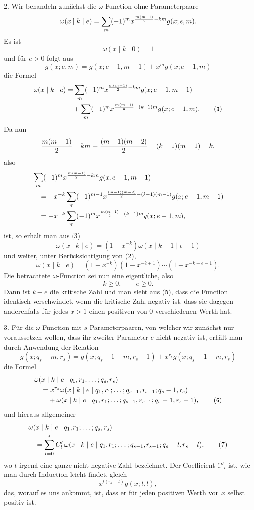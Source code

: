\documentclass[11pt,a4paper]{article}
\begin{document}
2. Wir behandeln zunächst die $\omega$-Function ohne Parameterpaare
\[
 \omega(x\mid k\mid e)=\sum_m(-1)^m x^{{m(m-1)\over2}-km}g(x;e,m).
\]
Es ist
\begin{equation}
 \omega(x\mid k\mid0)=1
\tag{2}
\end{equation}
und für $e>0$ folgt aus
\[
 g(x;e,m)=g(x;e-1,m-1)+x^m g(x;e-1,m)
\]
die Formel
\begin{align}
\omega(x\mid k\mid e)
&=\sum_m(-1)^m x^{{m(m-1)\over2}-km}g(x;e-1,m-1)\notag\\
&\quad+\sum_m(-1)^m x^{{m(m-1)\over2}-(k-1)m}g(x;e-1,m).
\tag{3}
\end{align}
Da nun
\[
 {m(m-1)\over2}-km={(m-1)(m-2)\over2}-(k-1)(m-1)-k,
\]
also
\begin{align*}
&\sum_m(-1)^m x^{{m(m-1)\over2}-km}g(x;e-1,m-1)\\
&\quad=-x^{-k}\sum_m(-1)^{m-1}x^{{(m-1)(m-2)\over2}-(k-1)(m-1)}g(x;e-1,m-1)\\
&\quad=-x^{-k}\sum_m(-1)^m x^{{m(m-1)\over2}-(k-1)m}g(x;e-1,m),
\end{align*}
ist, so erhält man aus (3)
\begin{equation}
 \omega(x\mid k\mid e)=(1-x^{-k})\omega(x\mid k-1\mid e-1)
\tag{4}
\end{equation}
und weiter, unter Berücksichtigung von (2),
\begin{equation}
 \omega(x\mid k\mid e)=(1-x^{-k})(1-x^{-k+1})\cdots(1-x^{-k+e-1}).
\tag{5}
\end{equation}
Die betrachtete $\omega$-Function sei nun eine eigentliche, also
\[
 k\ge0,
 \qquad e\ge0.
\]
Dann ist $k-e$ die kritische Zahl und man sieht aus (5), dass die Function identisch verschwindet, wenn die kritische Zahl negativ ist, dass sie dagegen anderenfalls für jedes $x>1$ einen positiven von 0 verschiedenen Werth hat.

3. Für die $\omega$-Function mit $s$ Parameterpaaren, von welcher wir zunächst nur voraussetzen wollen, dass ihr zweiter Parameter $e$ nicht negativ ist, erhält man durch Anwendung der Relation
\[
 g(x;q_s-m,r_s)=g(x;q_s-1-m,r_s-1)+x^{r_s}g(x;q_s-1-m,r_s)
\]
die Formel
\begin{align}
&\omega(x\mid k\mid e\mid q_1,r_1;\ldots;q_s,r_s)\notag\\
&\quad=x^{r_s}\omega(x\mid k\mid e\mid q_1,r_1;\ldots;q_{s-1},r_{s-1};q_s-1,r_s)\notag\\
&\qquad+\omega(x\mid k\mid e\mid q_1,r_1;\ldots;q_{s-1},r_{s-1};q_s-1,r_s-1),
\tag{6}
\end{align}
und hieraus allgemeiner
\begin{align}
&\omega(x\mid k\mid e\mid q_1,r_1;\ldots;q_s,r_s)\notag\\
&\quad=\sum_{l=0}^t C'_l\,
 \omega(x\mid k\mid e\mid q_1,r_1;\ldots;q_{s-1},r_{s-1};q_s-t,r_s-l),
\tag{7}
\end{align}
wo $t$ irgend eine ganze nicht negative Zahl bezeichnet. Der Coefficient $C'_l$ ist, wie man durch Induction leicht findet, gleich
\[
 x^{l(r_s-t)}g(x;t,l),
\]
das, worauf es uns ankommt, ist, dass er für jeden positiven Werth von $x$ selbst positiv ist.
\end{document}
